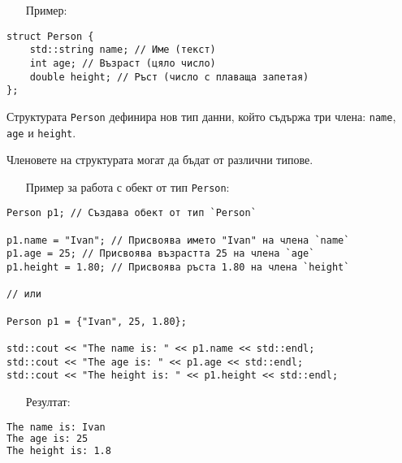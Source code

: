 \documentclass[oneside]{book}
\newcommand*{\code}[1]{\texttt{#1}}
\begin{document}
\begin{itemize}\item[Пример:]\end{itemize}
\begin{mdframed}\begin{lstlisting}
struct Person {
    std::string name; // Име (текст)
    int age; // Възраст (цяло число)
    double height; // Ръст (число с плаваща запетая)
};
\end{lstlisting}\end{mdframed}

Структурата \code{Person} дефинира нов тип данни, който съдържа три члена: \code{name}, \code{age} и \code{height}.

Членовете на структурата могат да бъдат от различни типове.
\pagebreak
\begin{itemize}\item[Пример] за работа с обект от тип \code{Person}:\end{itemize}\vspace{-12pt}
\begin{mdframed}\begin{lstlisting}
Person p1; // Създава обект от тип `Person`

p1.name = "Ivan"; // Присвоява името "Ivan" на члена `name`
p1.age = 25; // Присвоява възрастта 25 на члена `age`
p1.height = 1.80; // Присвоява ръста 1.80 на члена `height`

// или

Person p1 = {"Ivan", 25, 1.80};

std::cout << "The name is: " << p1.name << std::endl;
std::cout << "The age is: " << p1.age << std::endl;
std::cout << "The height is: " << p1.height << std::endl;
\end{lstlisting}\end{mdframed}

\begin{itemize}\item[Резултат:]\end{itemize}\vspace{-12pt}
\begin{mdframed}\begin{lstlisting}[language=bash]
The name is: Ivan
The age is: 25
The height is: 1.8
\end{lstlisting}\end{mdframed}
\end{document}
